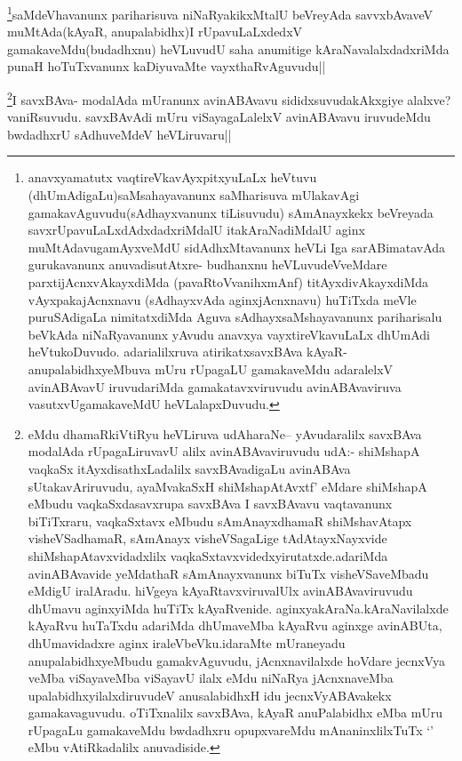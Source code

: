 \begin{artha}
\footnote{anavxyamatutx vaqtireVkavAyxpitxyuLaLx heVtuvu (dhUmAdigaLu)saMsahayavanunx saMharisuva mUlakavAgi gamakavAguvudu(sAdhayxvanunx tiLisuvudu) sAmAnayxkekx beVreyada savxrUpavuLaLxdAdxdadxriMdalU itakAraNadiMdalU aginx muMtAdavugamAyxveMdU sidAdhxMtavanunx heVLi Iga sarABimatavAda gurukavanunx anuvadisutAtxre- budhanxnu heVLuvudeVveMdare parxtijAcnxvAkayxdiMda (pavaRtoVvanihxmAnf) titAyxdivAkayxdiMda vAyxpakajAcnxnavu (sAdhayxvAda aginxjAcnxnavu) huTiTxda meVle puruSAdigaLa nimitatxdiMda Aguva sAdhayxsaMshayavanunx pariharisalu beVkAda niNaRyavanunx yAvudu anavxya vayxtireVkavuLaLx dhUmAdi heVtukoDuvudo. adarialilxruva atirikatxsavxBAva kAyaR- anupalabidhxyeMbuva mUru rUpagaLU gamakaveMdu adaralelxV avinABAvavU iruvudariMda gamakatavxviruvudu avinABAvaviruva vasutxvUgamakaveMdU heVLalapxDuvudu.}saMdeVhavanunx pariharisuva niNaRyakikxMtalU beVreyAda savvxbAvaveV  muMtAda(kAyaR, anupalabidhx)I rUpavuLaLxdedxV gamakaveMdu(budadhxnu) heVLuvudU saha anumitige kAraNavalalxdadxriMda punaH hoTuTxvanunx kaDiyuvaMte vayxthaRvAguvudu||
\end{artha}


\begin{artha}
\footnote{\stext \stext  eMdu dhamaRkiVtiRyu heVLiruva udAharaNe-- yAvudaralilx savxBAva modalAda rUpagaLiruvavU alilx avinABAvaviruvudu udA:- shiMshapA vaqkaSx itAyxdisathxLadalilx savxBAvadigaLu avinABAva sUtakavAriruvudu, ayaMvakaSxH shiMshapAtAvxtf' eMdare shiMshapA eMbudu vaqkaSxdasavxrupa savxBAva I savxBAvavu vaqtavanunx biTiTxraru, vaqkaSxtavx eMbudu sAmAnayxdhamaR shiMshavAtapx visheVSadhamaR, sAmAnayx visheVSagaLige tAdAtayxNayxvide shiMshapAtavxvidadxlilx vaqkaSxtavxvidedxyirutatxde.adariMda avinABAvavide yeMdathaR sAmAnayxvanunx biTuTx visheVSaveMbadu eMdigU iralAradu. hiVgeya kAyaRtavxviruvalUlx avinABAvaviruvudu dhUmavu aginxyiMda huTiTx kAyaRvenide. aginxyakAraNa.kAraNavilalxde kAyaRvu huTaTxdu adariMda dhUmaveMba kAyaRvu aginxge avinABUta, dhUmavidadxre aginx iraleVbeVku.idaraMte mUraneyadu anupalabidhxyeMbudu gamakvAguvudu, jAcnxnavilalxde hoVdare jecnxVya veMba viSayaveMba viSayavU ilalx eMdu niNaRya jAcnxnaveMba upalabidhxyilalxdiruvudeV anusalabidhxH idu jecnxVyABAvakekx gamakavaguvudu. oTiTxnalilx savxBAva, kAyaR anuPalabidhx eMba mUru rUpagaLu gamakaveMdu bwdadhxru opupxvareMdu mAnaninxlilxTuTx `\stext' eMbu vAtiRkadalilx anuvadiside.}I savxBAva- modalAda mUranunx avinABAvavu sididxsuvudakAkxgiye alalxve? vaniRsuvudu. savxBAvAdi mUru viSayagaLalelxV avinABAvavu iruvudeMdu bwdadhxrU sAdhuveMdeV heVLiruvaru||
\end{artha}

